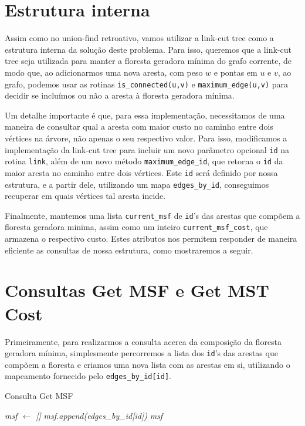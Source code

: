 \section{Estrutura interna}
\label{sec:imsf-est-int}

Assim como no union-find retroativo, vamos utilizar a link-cut tree como a estrutura interna da solução deste problema. Para isso, queremos que a link-cut tree seja utilizada para manter a floresta geradora mínima do grafo corrente, de modo que, ao adicionarmos uma nova aresta, com peso $w$ e pontas em $u$ e $v$, ao grafo, podemos usar as rotinas \texttt{is\_connected(u,v)} e \texttt{maximum\_edge(u,v)} para decidir se incluímos ou não a aresta à floresta geradora mínima.

Um detalhe importante é que, para essa implementação, necessitamos de uma maneira de consultar qual a aresta com maior custo no caminho entre dois vértices na árvore, não apenas o seu respectivo valor. Para isso, modificamos a implementação da link-cut tree para incluir um novo parâmetro opcional \texttt{id} na rotina \texttt{link}, além de um novo  método \texttt{maximum\_edge\_id}, que retorna o \texttt{id} da maior aresta no caminho entre dois vértices. Este \texttt{id} será definido por nossa estrutura, e a partir dele, utilizando um mapa \texttt{edges\_by\_id}, conseguimos recuperar em quais vértices tal aresta incide.

Finalmente, mantemos uma lista \texttt{current\_msf} de \texttt{id}'s das arestas que compõem a floresta geradora minima, assim como um inteiro \texttt{current\_msf\_cost}, que armazena o respectivo custo. Estes atributos nos permitem responder de maneira eficiente as consultas de nossa estrutura, como mostraremos a seguir.

\section{Consultas Get MSF e Get MST Cost}
\label{sec:imsf-get-msf}

Primeiramente, para realizarmos a consulta acerca da composição da floresta geradora mínima, simplesmente percorremos a lista dos \texttt{id}'s das arestas que compõem a floresta e criamos uma nova lista com as arestas em si, utilizando o mapeamento fornecido pelo \texttt{edges\_by\_id[id]}.

\begin{algorithm}[h!]
    \caption{Consulta Get MSF}\label{imsf-get-msf}
    \begin{algorithmic}
        \State \emph{msf $\gets$ []}
        \State \emph{msf.append(edges\_by\_id[id])}
        \EndFor
        \State \Return \emph{msf}
        \EndFunction
    \end{algorithmic}
\end{algorithm}

